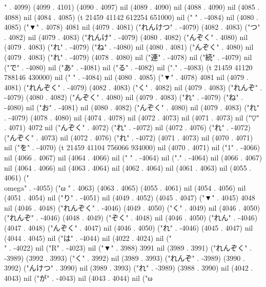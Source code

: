 {" . 4099) (4099 . 4101) (4090 . 4097) nil (4089 . 4090) nil (4088 . 4090) nil (4085 . 4088) nil (4084 . 4085) (t 21459 41142 612254 651000) nil (" " . -4084) nil (4080 . 4085) ("▼" . 4078) 4081 nil (4079 . 4081) ("れんけつ" . -4079) (4082 . 4083) ("つ" . 4082) nil (4079 . 4083) ("れんけ" . -4079) (4080 . 4082) ("んぞく" . 4080) nil (4079 . 4083) ("れ" . -4079) ("ね" . -4080) nil (4080 . 4081) ("んぞく" . 4080) nil (4079 . 4083) ("れ" . -4079) (4078 . 4080) nil ("連" . -4078) nil ("続" . -4079) nil ("で" . -4080) nil ("あ" . -4081) nil ("る" . -4082) nil ("." . -4083) (t 21459 41120 788146 430000) nil (" " . -4084) nil (4080 . 4085) ("▼" . 4078) 4081 nil (4079 . 4081) ("れんぞく" . -4079) (4082 . 4083) ("く" . 4082) nil (4079 . 4083) ("れんぞ" . -4079) (4080 . 4082) ("んぞく" . 4080) nil (4079 . 4083) ("れ" . -4079) ("ね" . -4080) nil ("お" . -4081) nil (4080 . 4082) ("んぞく" . 4080) nil (4079 . 4083) ("れ" . -4079) (4078 . 4080) nil (4074 . 4078) nil (4072 . 4073) nil (4071 . 4073) nil ("▽" . 4071) 4072 nil ("んぞく" . 4072) ("れ" . -4072) nil (4072 . 4076) ("れ" . -4072) ("んぞく" . 4073) nil (4072 . 4076) ("れ" . -4072) (4071 . 4073) nil (4070 . 4071) nil ("を" . -4070) (t 21459 41104 756066 934000) nil (4070 . 4071) nil ("1" . -4066) nil (4066 . 4067) nil (4064 . 4066) nil (" " . -4064) nil ("." . -4064) nil (4066 . 4067) nil (4064 . 4066) nil (4063 . 4064) nil (4062 . 4064) nil (4061 . 4063) nil (4055 . 4061) ("\\omega" . -4055) ("ω
" . 4063) (4063 . 4065) (4055 . 4061) nil (4054 . 4056) nil (4051 . 4054) nil ("り" . -4051) nil (4049 . 4052) (4045 . 4047) ("▼" . 4045) 4048 nil (4046 . 4048) ("れんぞく" . -4046) (4049 . 4050) ("く" . 4049) nil (4046 . 4050) ("れんぞ" . -4046) (4048 . 4049) ("ぞく" . 4048) nil (4046 . 4050) ("れん" . -4046) (4047 . 4048) ("んぞく" . 4047) nil (4046 . 4050) ("れ" . -4046) (4045 . 4047) nil (4044 . 4045) nil ("は" . -4044) nil (4022 . 4024) nil ("\\" . -4022) nil ("R" . -4023) nil ("▼" . 3988) 3991 nil (3989 . 3991) ("れんぞく" . -3989) (3992 . 3993) ("く" . 3992) nil (3989 . 3993) ("れんぞ" . -3989) (3990 . 3992) ("んけつ" . 3990) nil (3989 . 3993) ("れ" . -3989) (3988 . 3990) nil (4042 . 4043) nil ("が" . -4043) nil (4043 . 4044) nil ("ω
}
